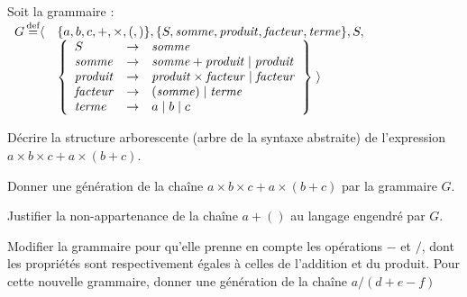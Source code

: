 
\begingroup

\begin{exercice}\label{exo:parsing/grammars/calculator}

  Soit la grammaire :
  $\begin{array}[t]{ll}
    G \operatorname{\stackrel{\text{def}}{=}}  \langle &  \{a, b, c, +, \times, (, )\}, \{S, \mathit{somme}, \mathit{produit}, \mathit{facteur}, \mathit{terme}\}, S,\\
    & \left\{ \begin{array}{lll}
      S                &\rightarrow& \mathit{somme} \\
      \mathit{somme}   &\rightarrow& \mathit{somme} + \mathit{produit} \mid \mathit{produit} \\
      \mathit{produit} &\rightarrow& \mathit{produit} \times \mathit{facteur} \mid  \mathit{facteur} \\
      \mathit{facteur} &\rightarrow& ( \mathit{somme} ) \mid \mathit{terme} \\
      \mathit{terme}   &\rightarrow& a \mid  b \mid  c
    \end{array} \right\}\;\rangle
  \end{array}$

  \begin{questions}
  \item Décrire la structure arborescente (arbre de la syntaxe abstraite) de l'expression $a \times b \times c + a \times (b + c)$.
  \item Donner une génération de la chaîne $a \times b \times c + a \times (b + c)$ par la grammaire $G$.
  \item Justifier la non-appartenance de la chaîne $a + ()$ au langage engendré par $G$.
  \item Modifier la grammaire pour qu'elle prenne en compte les opérations $-$ et $/$,
    dont les propriétés sont respectivement égales à celles de l'addition et du produit.
    Pour cette nouvelle grammaire, donner une génération de la chaîne $a/(d + e - f)$
  \end{questions}

\end{exercice}

